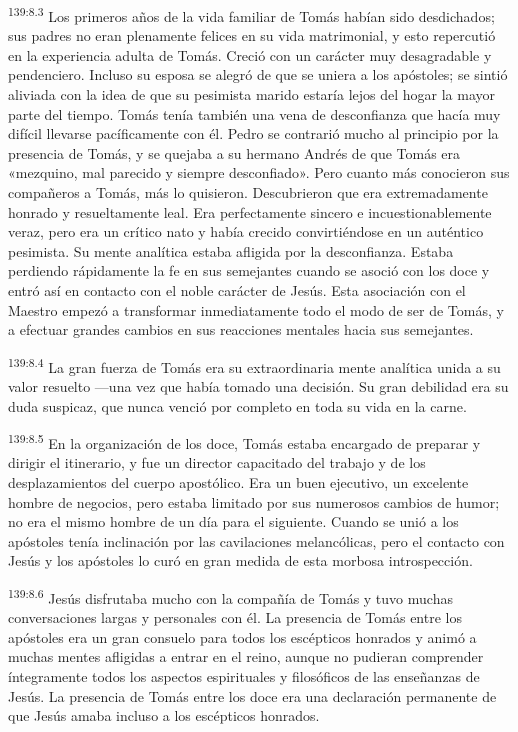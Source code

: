 \par
\textsuperscript{139:8.3} Los primeros años de la vida familiar de Tomás habían sido desdichados; sus padres no eran plenamente felices en su vida matrimonial, y esto repercutió en la experiencia adulta de Tomás. Creció con un carácter muy desagradable y pendenciero. Incluso su esposa se alegró de que se uniera a los apóstoles; se sintió aliviada con la idea de que su pesimista marido estaría lejos del hogar la mayor parte del tiempo. Tomás tenía también una vena de desconfianza que hacía muy difícil llevarse pacíficamente con él. Pedro se contrarió mucho al principio por la presencia de Tomás, y se quejaba a su hermano Andrés de que Tomás era «mezquino, mal parecido y siempre desconfiado». Pero cuanto más conocieron sus compañeros a Tomás, más lo quisieron. Descubrieron que era extremadamente honrado y resueltamente leal. Era perfectamente sincero e incuestionablemente veraz, pero era un crítico nato y había crecido convirtiéndose en un auténtico pesimista. Su mente analítica estaba afligida por la desconfianza. Estaba perdiendo rápidamente la fe en sus semejantes cuando se asoció con los doce y entró así en contacto con el noble carácter de Jesús. Esta asociación con el Maestro empezó a transformar inmediatamente todo el modo de ser de Tomás, y a efectuar grandes cambios en sus reacciones mentales hacia sus semejantes.

\par
\textsuperscript{139:8.4} La gran fuerza de Tomás era su extraordinaria mente analítica unida a su valor resuelto ---una vez que había tomado una decisión. Su gran debilidad era su duda suspicaz, que nunca venció por completo en toda su vida en la carne.

\par
\textsuperscript{139:8.5} En la organización de los doce, Tomás estaba encargado de preparar y dirigir el itinerario, y fue un director capacitado del trabajo y de los desplazamientos del cuerpo apostólico. Era un buen ejecutivo, un excelente hombre de negocios, pero estaba limitado por sus numerosos cambios de humor; no era el mismo hombre de un día para el siguiente. Cuando se unió a los apóstoles tenía inclinación por las cavilaciones melancólicas, pero el contacto con Jesús y los apóstoles lo curó en gran medida de esta morbosa introspección.

\par
\textsuperscript{139:8.6} Jesús disfrutaba mucho con la compañía de Tomás y tuvo muchas conversaciones largas y personales con él. La presencia de Tomás entre los apóstoles era un gran consuelo para todos los escépticos honrados y animó a muchas mentes afligidas a entrar en el reino, aunque no pudieran comprender íntegramente todos los aspectos espirituales y filosóficos de las enseñanzas de Jesús. La presencia de Tomás entre los doce era una declaración permanente de que Jesús amaba incluso a los escépticos honrados.

